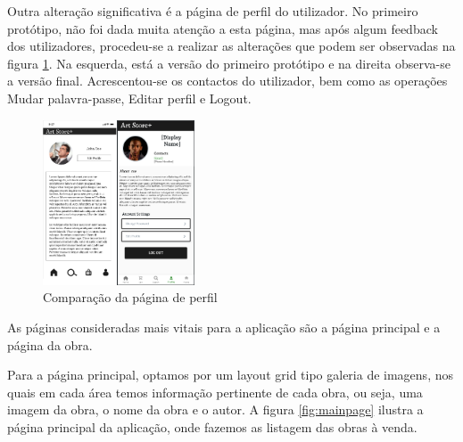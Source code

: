 \documentclass[conference]{IEEEtran}
\begin{document}
Outra alteração significativa é a página de perfil do utilizador. No primeiro protótipo, 
não foi dada muita atenção a esta página, mas após algum feedback dos utilizadores, procedeu-se 
a realizar as alterações que podem ser observadas na figura \ref{fig:profilevs}. Na esquerda, 
está a versão do primeiro protótipo e na direita observa-se a versão final. Acrescentou-se 
os contactos do utilizador, bem como as operações Mudar palavra-passe, Editar perfil e Logout.

\begin{figure}[h]
    \centering
    \includegraphics[width=0.4\textwidth]{profile-early-vs-latest.png}
    \caption{Comparação da página de perfil}
    \label{fig:profilevs}
\end{figure}

As páginas consideradas mais vitais para a aplicação são a página principal e a página da obra.

Para a página principal, optamos por um layout grid tipo galeria de imagens, nos quais em cada 
área temos informação pertinente de cada obra, ou seja, uma imagem da obra, o nome da obra e o autor.
A figura \ref{fig:mainpage} ilustra a página principal da aplicação, onde fazemos as listagem das obras 
à venda.
\end{document}
